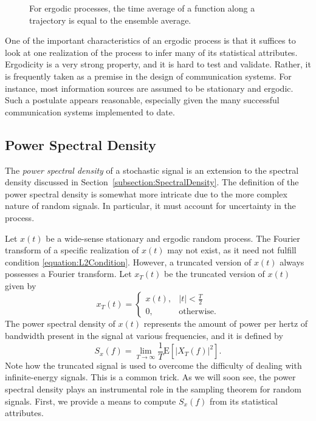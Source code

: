 \begin{figure}[htbp]
\begin{center}
\caption{For ergodic processes, the time average of a function along a trajectory is equal to the ensemble average.}
\label{figure:ErgodicProcess}
\end{center}
\end{figure}

One of the important characteristics of an ergodic process is that it suffices to look at one realization of the process to infer many of its statistical attributes.
Ergodicity is a very strong property, and it is hard to test and validate.
Rather, it is frequently taken as a premise in the design of communication systems.
For instance, most information sources are assumed to be stationary and ergodic.
Such a postulate appears reasonable, especially given the many successful communication systems implemented to date.


\subsection{Power Spectral Density}

The \emph{power spectral density} of a stochastic signal is an extension to the spectral density discussed in Section~\ref{subsection:SpectralDensity}.
The definition of the power spectral density is somewhat more intricate due to the more complex nature of random signals.
In particular, it must account for uncertainty in the process.

Let $x(t)$ be a wide-sense stationary and ergodic random process.
The Fourier transform of a specific realization of $x(t)$ may not exist, as it need not fulfill condition \eqref{equation:L2Condition}.
However, a truncated version of $x(t)$ always possesses a Fourier transform.
Let $x_T(t)$ be the truncated version of $x(t)$ given by
\begin{equation*}
x_T(t) = \begin{cases} x(t), & |t| < \frac{T}{2} \\
0, & \text{otherwise} . \end{cases}
\end{equation*}
The power spectral density of $x(t)$ represents the amount of power per hertz of bandwidth present in the signal at various frequencies, and it is defined by
\begin{equation*}
S_x(f) = \lim_{T \rightarrow \infty} \frac{1}{T} \mathrm{E} \left[ |X_T(f)|^2 \right] .
\end{equation*}
Note how the truncated signal is used to overcome the difficulty of dealing with infinite-energy signals.
This is a common trick.
As we will soon see, the power spectral density plays an instrumental role in the sampling theorem for random signals.
First, we provide a means to compute $S_x(f)$ from its statistical attributes.

